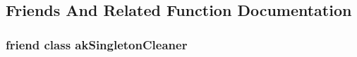 \subsection{Friends And Related Function Documentation}
\hypertarget{classakTimeLib_aa7613c42aff93f7383b7f7298e0957b9}{
\subsubsection[{ak\-Singleton\-Cleaner}]{\setlength{\rightskip}{0pt plus 5cm}friend class {\bf ak\-Singleton\-Cleaner}\hspace{0.3cm}{\ttfamily [friend]}}}\label{classakTimeLib_aa7613c42aff93f7383b7f7298e0957b9}


